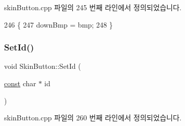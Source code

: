 skin\+Button.\+cpp 파일의 245 번째 라인에서 정의되었습니다.


\begin{DoxyCode}
246 \{
247   downBmp = bmp;
248 \}
\end{DoxyCode}
\mbox{\label{class_skin_button_ae710ecb793cf09d625d842bb863aa1da}} 
\subsubsection{\texorpdfstring{Set\+Id()}{SetId()}}
{\footnotesize\ttfamily void Skin\+Button\+::\+Set\+Id (\begin{DoxyParamCaption}\item[{\mbox{\hyperlink{getopt1_8c_a2c212835823e3c54a8ab6d95c652660e}{const}} char $\ast$}]{id }\end{DoxyParamCaption})}



skin\+Button.\+cpp 파일의 260 번째 라인에서 정의되었습니다.


